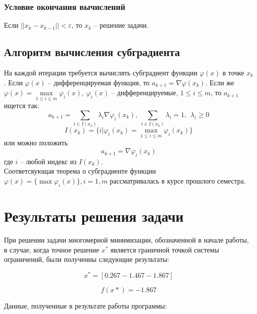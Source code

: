\documentclass{article}
\begin{document}
\subsubsection{Условие окончания вычислений}
\noindent Если $||x_k-x_{k-1}|| < \varepsilon$, то $x_k$ -- решение задачи.

\subsection{Алгоритм вычисления субградиента}
\noindent На каждой итерации требуется вычислять субградиент функции $\varphi(x)$ в точке $x_k$. Если $\varphi(x)$ -- дифференцируемая функция, то $a_{k+1} = \nabla \varphi(x_k)$. Если же $\varphi(x)=\max \limits_{1\le i \le m} {\varphi_i(x)},~ \varphi_i(x)$ -- дифференцируемые, $1\le i \le m$, то $a_{k+1}$ ищется так:
$$a_{k+1} = \sum_{i \in I(x_k)} \lambda_i \nabla \varphi_i(x_k),~\sum_{i \in I(x_k)} \lambda_i = 1,~~ \lambda_i \ge 0$$
$$I(x_k) = \{ i| \varphi_i(x_k) = \max \limits_{1\le i \le m} \varphi_i(x_k)\}$$
или можно положить $$a_{k+1} = \nabla \varphi_i(x_k)$$
где $i$ -- любой индекс из $I(x_k)$. \\

\noindent Соответсвующая теорема о субградиенте функции $\varphi(x)=\{ \max{\varphi_i(x)} \}, i=\overline{1,m}$ рассматривалась в курсе прошлого семестра.

\section{Результаты решения задачи}
    
    \noindent  При решении задачи многомерной минимизации, обозначенной в начале работы, в случае, когда точное решение $x^*$ является граничной точкой системы ограничений, были полученны следующие результаты:
    
    \begin{equation*}
        x^{*} = [0.267 -1.467 -1.867]
    \end{equation*}
    
    \begin{equation*}
        f(x*) = -1.867
    \end{equation*}
    
\noindent Данные, полученные в результате работы программы:
    
\end{document}
